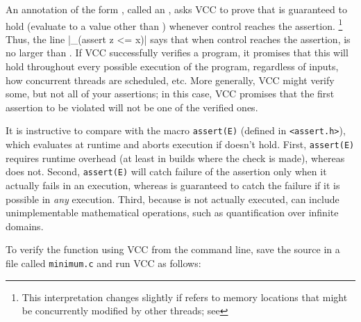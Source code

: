 An annotation of the form , called an , asks VCC to prove that
 is guaranteed to hold (\ie evaluate to a value other than )
whenever control reaches the assertion.%
\footnote{
  This interpretation changes slightly if  refers to
  memory locations that might be concurrently modified by other
  threads; see }  
Thus, the line \vcc|_(assert z <= x)| says
that when control reaches the assertion,  is no larger than .
If VCC successfully verifies a program, it promises that this will hold throughout 
every possible execution of the program, regardless of inputs, how concurrent
threads are scheduled, etc. More generally, VCC might verify some, but not all of your assertions; 
in this case, VCC promises that the first assertion to be violated will not be one of the verified ones.

\begin{note}
It is instructive to compare  with the macro
\lstinline|assert(E)| (defined in \lstinline|<assert.h>|), which
evaluates   at runtime and aborts execution if 
doesn't hold. First, \lstinline|assert(E)| requires runtime overhead (at least
in builds where the check is made), whereas  does
not. Second, \lstinline|assert(E)| will catch failure of the 
assertion only when it actually fails in an execution, whereas 
 is guaranteed to catch the failure if it is
possible in \emph{any} execution. Third, because
 is not actually executed,  can include
unimplementable mathematical operations, such as
quantification over infinite domains.
\end{note}

To verify the function using VCC from the command line, save the source in a file called \lstinline|minimum.c|
and run VCC as follows:

